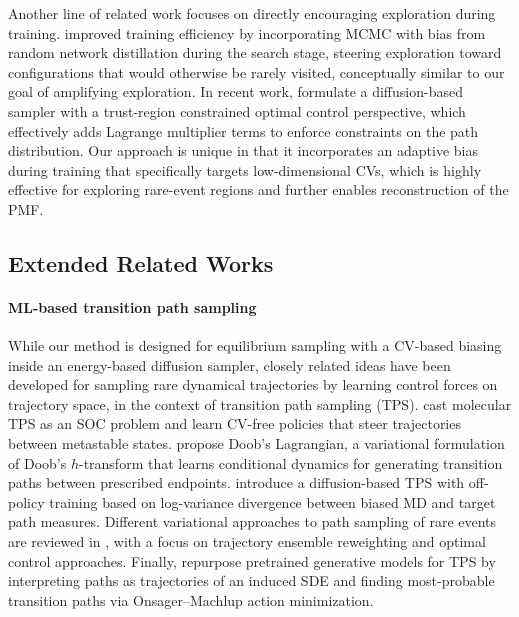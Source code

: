 \documentclass[]{fairmeta}
\theoremstyle{remark}
\begin{document}
Another line of related work focuses on directly encouraging exploration during training. \citet{kim2025scalable} improved training efficiency by incorporating MCMC with bias from random network distillation during the search stage, steering exploration toward configurations that would otherwise be rarely visited, conceptually similar to our goal of amplifying exploration.
In recent work, \citet{blessing2025trust} formulate a diffusion-based sampler with a trust-region constrained optimal control perspective, which effectively adds Lagrange multiplier terms to enforce constraints on the path distribution.
Our approach is unique in that it incorporates an adaptive bias during training that specifically targets low-dimensional CVs, which is highly effective for exploring rare-event regions and further enables reconstruction of the PMF.


\subsection{Extended Related Works}

\paragraph{ML-based transition path sampling}
While our method is designed for equilibrium sampling with a CV-based biasing inside an energy-based diffusion sampler, closely related ideas have been developed for sampling rare dynamical trajectories by learning control forces on trajectory space, in the context of transition path sampling (TPS).
\citet{holdijk2023stochastic} cast molecular TPS as an SOC problem and learn CV-free policies that steer trajectories between metastable states.
\citet{du2024doob} propose Doob's Lagrangian, a variational formulation of Doob's $h$-transform \citep{doob1957conditional} that learns conditional dynamics for generating transition paths between prescribed endpoints.
\citet{seong2025transition} introduce a diffusion-based TPS with off-policy training based on log-variance divergence between biased MD and target path measures.
Different variational approaches to path sampling of rare events are reviewed in \citet{singh2025variational}, with a focus on trajectory ensemble reweighting and optimal control approaches.
Finally, \citet{raja2025action} repurpose pretrained generative models for TPS by interpreting paths as trajectories of an induced SDE and finding most-probable transition paths via Onsager--Machlup action minimization.
\end{document}
